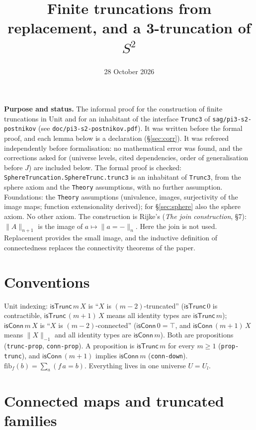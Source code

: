 \documentclass[11pt]{amsart}
\title{Finite truncations from replacement, and a 3-truncation of $S^2$}
\date{28 October 2026}
\theoremstyle{definition}
\theoremstyle{remark}
\newcommand{\fib}{\mathrm{fib}}
\newcommand{\code}[1]{\texttt{#1}}
\newcommand{\cT}{\mathsf{isTrunc}}
\newcommand{\cC}{\mathsf{isConn}}
\begin{document}
\maketitle

\noindent\textbf{Purpose and status.} The informal proof for the
construction of finite truncations in Unit and for an inhabitant of the
interface \code{Trunc3} of \code{sag/pi3-s2-postnikov}
(see \code{doc/pi3-s2-postnikov.pdf}). It was written before the formal
proof, and each lemma below is a declaration
(\S\ref{sec:corr}). It was refereed independently before formalisation:
no mathematical error was found, and the corrections asked for (universe
levels, cited dependencies, order of generalisation before $J$) are
included below. The formal proof is checked: \code{SphereTruncation.SphereTrunc.trunc3}
is an inhabitant of \code{Trunc3}, from the sphere axiom and the
\code{Theory} assumptions, with no further assumption. Foundations: the
\code{Theory} assumptions (univalence, images, surjectivity of the image
maps; function extensionality derived); for \S\ref{sec:sphere} also the
sphere axiom. No other axiom. The construction is Rijke's (\emph{The join
construction}, \S7): $\|A\|_{n+1}$ is the image of
$a\mapsto\|a=-\|_n$. Here the join is not used. Replacement provides the
small image, and the inductive definition of connectedness replaces
the connectivity theorems of the paper.

\section{Conventions}

Unit indexing: $\cT\,m\,X$ is ``$X$ is $(m-2)$-truncated'' ($\cT\,0$ is
contractible, $\cT\,(m+1)\,X$ means all identity types are $\cT\,m$);
$\cC\,m\,X$ is ``$X$ is $(m-2)$-connected'' ($\cC\,0=\top$, and
$\cC\,(m+1)\,X$ means $\|X\|_{-1}$ and all identity types are $\cC\,m$).
Both are propositions (\code{trunc-prop}, \code{conn-prop}). A
proposition is $\cT\,m$ for every $m\ge1$ (\code{prop-trunc}), and
$\cC\,(m+1)$ implies $\cC\,m$ (\code{conn-down}).
$\fib_f(b)=\sum_a(f\,a=b)$. Everything lives in one universe $U=U_l$.

\section{Connected maps and truncated families}
\end{document}
